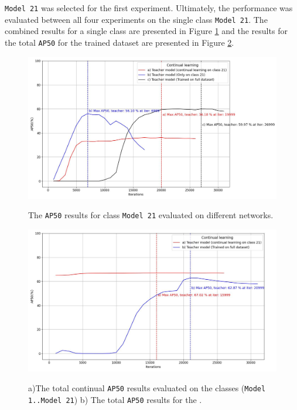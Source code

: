 \texttt{Model 21} was selected for the first experiment. Ultimately, the performance was evaluated between all four experiments on the single class \texttt{Model 21}. The combined results for a single class are presented in Figure  \ref{myModel_continuous_experiment_1} and the results for the total \texttt{AP50} for the trained dataset are presented in Figure \ref{myModel_continuous_experiment_3}.

\begin{figure}[htb]
	\begin{center}
		\includegraphics[width=14cm]{./AP50_continual_21.jpg}
	\end{center}
	\caption{The \texttt{AP50} results for class \texttt{Model 21} evaluated on different networks.}
	\begin{center}
		\label{myModel_continuous_experiment_1}
	\end{center}
\end{figure}
\FloatBarrier  

\begin{figure}[htb]
	\begin{center}
		\includegraphics[width=14cm]{./AP50_continual_21_allClasses.jpg}
	\end{center}
	\caption{a)The total continual \texttt{AP50} results evaluated on the classes (\texttt{Model 1..Model 21}) b) The total \texttt{AP50} results for the .}
	\begin{center}
	\label{myModel_continuous_experiment_3}
	\end{center}
\end{figure}
\FloatBarrier 

